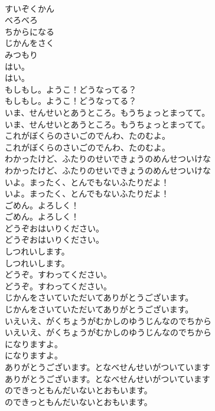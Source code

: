 \documentclass[8pt]{extreport}
\begin{document}
\begin{CJK}{UTF8}{min}
\\	すいぞくかん
\\	べろべろ
\\	ちからになる
\\	じかんをさく
\\	みつもり
\\	はい。	
\\	はい。 
\\	もしもし。ようこ！どうなってる？	
\\	もしもし。ようこ！どうなってる？ 
\\	いま、せんせいとあうところ。もうちょっとまってて。	
\\	いま、せんせいとあうところ。もうちょっとまってて。 
\\	これがぼくらのさいごのでんわ、たのむよ。	
\\	これがぼくらのさいごのでんわ、たのむよ。 
\\	わかったけど、ふたりのせいできょうのめんせついけな	
\\	わかったけど、ふたりのせいできょうのめんせついけな 
\\	いよ。まったく、とんでもないふたりだよ！	
\\	いよ。まったく、とんでもないふたりだよ！ 
\\	ごめん。よろしく！	
\\	ごめん。よろしく！ 
\\	どうぞおはいりください。	
\\	どうぞおはいりください。 
\\	しつれいします。	
\\	しつれいします。 
\\	どうぞ。すわってください。	
\\	どうぞ。すわってください。 
\\	じかんをさいていただいてありがとうございます。	
\\	じかんをさいていただいてありがとうございます。 
\\	いえいえ、がくちょうがむかしのゆうじんなのでちから	
\\	いえいえ、がくちょうがむかしのゆうじんなのでちから 
\\	になりますよ。	
\\	になりますよ。 
\\	ありがとうございます。となべせんせいがついています	
\\	ありがとうございます。となべせんせいがついています 
\\	のできっともんだいないとおもいます。	
\\	のできっともんだいないとおもいます。 

\end{CJK}
\end{document}
